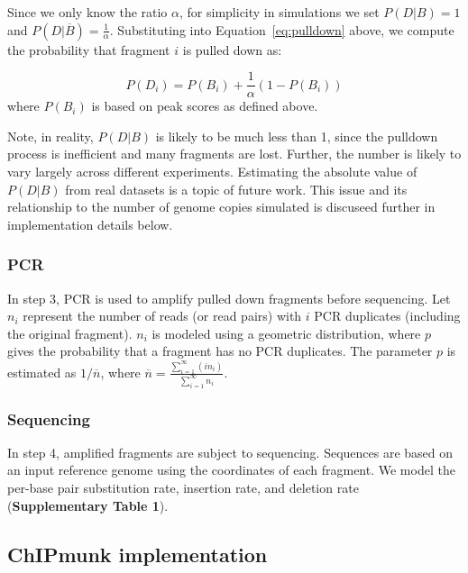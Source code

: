 \documentclass[12pt]{article}
\begin{document}
Since we only know the ratio $\alpha$, for simplicity in simulations we set $P(D|B)=1$ and $P(D|\overline{B})=\frac{1}{\alpha}$.
Substituting into Equation~\ref{eq:pulldown} above, we compute the probability that fragment $i$ is pulled down as:

\begin{equation}
  P(D_i) = P(B_i) + \frac{1}{\alpha}(1-P(B_i))
\end{equation}
where $P(B_i)$ is based on peak scores as defined above.

Note, in reality, $P(D|B)$ is likely to be much less than 1, since the pulldown process is inefficient and many fragments are lost.
Further, the number is likely to vary largely across different experiments.
Estimating the absolute value of $P(D|B)$ from real datasets is a topic of future work.
This issue and its relationship to the number of genome copies simulated is discuseed further in implementation details below.

\subsubsection*{PCR}

In step 3, PCR is used to amplify pulled down fragments before sequencing.
Let $n_i$ represent the number of reads (or read pairs) with $i$ PCR duplicates (including the original fragment).
$n_i$ is modeled using a geometric distribution, where $p$ gives the probability that a fragment has no PCR duplicates.
The parameter $p$ is estimated as $1/\overline{n}$, where $\overline{n} = \frac{\sum_{i=1}^\infty (i  n_i)}{\sum_{i=1}^\infty n_i}$.

\subsubsection*{Sequencing}

In step 4, amplified fragments are subject to sequencing.
Sequences are based on an input reference genome using the coordinates of each fragment.
We model the per-base pair substitution rate, insertion rate, and deletion rate (\textbf{Supplementary Table 1}).

\subsection*{ChIPmunk implementation}
\end{document}
